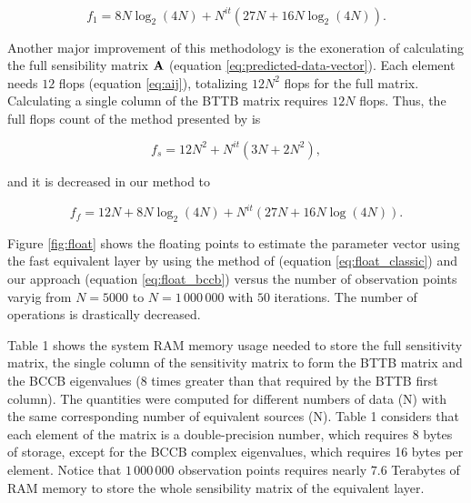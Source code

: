 \documentclass[manuscript,revised]{geophysics}
\begin{document}
\begin{equation}
f_1 = 8N\log_2(4N) + N^{it} (27N + 16N\log_2(4N)).
\label{eq:float_bccb}
\end{equation}

Another major improvement of this methodology is the exoneration of calculating the full sensibility matrix $\tensor{A}$ (equation \ref{eq:predicted-data-vector}). Each element needs $12$ flops (equation \ref{eq:aij}), totalizing $12N^2$ flops for the full matrix. Calculating a single column of the BTTB matrix requires $12N$ flops.
Thus, the full flops count of the method presented by \citet{siqueira-etal2017} is

\begin{equation}
f_s = 12N^2 + N^{it} (3N + 2N^2),
\label{eq:float_siqueira}
\end{equation}

and it is decreased in our method to

\begin{equation}
f_f = 12N + 8N \log_2(4N) + N^{it} (27N + 16N\log(4N)).
\label{eq:float_new}
\end{equation}

Figure \ref{fig:float} shows the floating points to estimate the parameter vector using the fast equivalent layer by using the method of \citet{siqueira-etal2017} (equation \ref{eq:float_classic}) and our approach (equation \ref{eq:float_bccb}) versus the number of observation points varyig from $N = 5000$ to $N = 1\,000\,000$ with $50$ iterations. The number of operations is drastically decreased.

Table 1 shows the system RAM memory usage needed to store the full sensitivity matrix, the single column of the sensitivity matrix to form the BTTB matrix and the BCCB eigenvalues ($8$ times greater than that required by the BTTB first column). The quantities were computed for different numbers of data (N) with the same corresponding number of equivalent sources (N). Table 1 considers that each element of the matrix is a double-precision number, which requires 8 bytes of storage, except for the BCCB complex eigenvalues, which requires 16 bytes per element. Notice that $1\,000\,000$ observation points requires nearly $7.6$ Terabytes of RAM memory to store the whole sensibility matrix of the equivalent layer.
\end{document}
